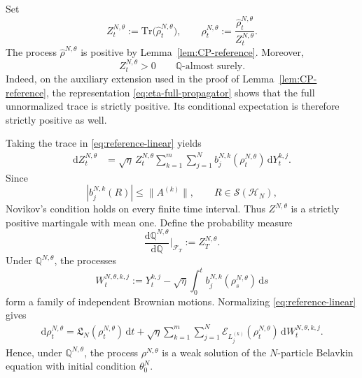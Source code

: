 \documentclass[10pt,a4paper,reqno]{amsart}
\numberwithin{equation}{section}
\theoremstyle{plain}
\theoremstyle{definition}
\theoremstyle{remark}
\renewcommand{\d}{\mathrm d}
\newcommand{\Tr}{\mathrm{Tr}}
\newcommand{\Q}{\mathbb Q}
\newcommand{\cS}{\mathcal S}
\newcommand{\cF}{\mathcal F}
\newcommand{\cE}{\mathcal E}
\newcommand{\HH}{\mathcal H}
\newcommand{\1}{\mathbf 1}
\begin{document}
Set
\begin{equation}
  Z_t^{N,\theta}
  :=
  \Tr\bigl(\widehat\rho_t^{N,\theta}\bigr),
  \qquad
  \rho_t^{N,\theta}
  :=
  \frac{
    \widehat\rho_t^{N,\theta}
  }{
    Z_t^{N,\theta}
  }.
  \label{eq:perturbation-normalization}
\end{equation}
The process \(\widehat\rho^{N,\theta}\) is positive by
Lemma~\ref{lem:CP-reference}.  Moreover,
\[
  Z_t^{N,\theta}>0
  \qquad
  \Q\text{-almost surely}.
\]
Indeed, on the auxiliary extension used in the proof of Lemma~\ref{lem:CP-reference}, the representation \eqref{eq:eta-full-propagator} shows that the full unnormalized trace is strictly positive.  Its conditional expectation is therefore strictly positive as well.

Taking the trace in \eqref{eq:reference-linear} yields
\begin{equation}
\begin{aligned}
  \d Z_t^{N,\theta}
  &=
  \sqrt{\eta}\,
  Z_t^{N,\theta}
  \sum_{k=1}^m\sum_{j=1}^N
  b_j^{N,k}(\rho_t^{N,\theta})\,\d Y_t^{k,j}.
\end{aligned}
  \label{eq:perturbation-Z-SDE}
\end{equation}
Since
\[
  \left|
    b_j^{N,k}(R)
  \right|
  \le
  \|A^{(k)}\|,
  \qquad
  R\in\cS(\HH_N),
\]
Novikov's condition holds on every finite time interval.  Thus
\(Z^{N,\theta}\) is a strictly positive martingale with mean one.  Define
the probability measure
\begin{equation}
  \frac{\d\Q^{N,\theta}}{\d\Q}
  \bigg|_{\cF_T}
  :=
  Z_T^{N,\theta}.
  \label{eq:perturbation-Qtheta}
\end{equation}
Under \(\Q^{N,\theta}\), the processes
\begin{equation}
  W_t^{N,\theta,k,j}
  :=
  Y_t^{k,j}
  -
  \sqrt{\eta}
  \int_0^t
  b_j^{N,k}(\rho_s^{N,\theta})\,\d s
  \label{eq:perturbation-Wtheta}
\end{equation}
form a family of independent Brownian motions.  Normalizing
\eqref{eq:reference-linear} gives
\begin{equation}
\begin{aligned}
  \d\rho_t^{N,\theta}
  =
  \mathfrak L_N(\rho_t^{N,\theta})\,\d t+
  \sqrt{\eta}
  \sum_{k=1}^m\sum_{j=1}^N
  \cE_{L_j^{(k)}}(\rho_t^{N,\theta})
  \,\d W_t^{N,\theta,k,j}.
\end{aligned}
  \label{eq:perturbation-nonlinear-N}
\end{equation}
Hence, under \(\Q^{N,\theta}\), the process
\(\rho^{N,\theta}\) is a weak solution of the \(N\)-particle Belavkin
equation with initial condition \(\theta_0^N\).
\end{document}
